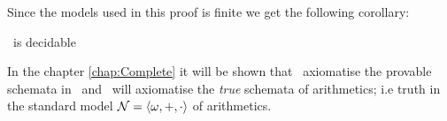\documentclass[../main.tex]{subfiles}
\begin{document}
Since the models used in this proof is finite we get the following corollary:
\begin{cor}
	\GLS\ is decidable 
\end{cor}
In the chapter \ref{chap:Complete} it will be shown that \GL\ axiomatise the
provable schemata in \PRA\ and \GLS\ will axiomatise the \textit{true} schemata
of arithmetics; i.e truth in the standard model $\mathcal{N}=\langle
\omega,+,\cdot\rangle$ of arithmetics.
\end{document}

